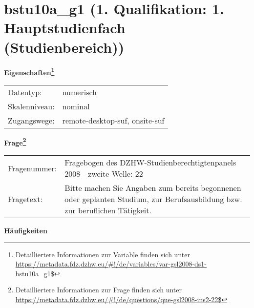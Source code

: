 
    \setcounter{footnote}{0}

    \vspace*{-1.8cm}
	\section{bstu10a\_g1 (1. Qualifikation: 1. Hauptstudienfach (Studienbereich))}
	\label{section:bstu10a_g1}



    \vspace*{0.5cm}
    \noindent\textbf{Eigenschaften\footnote{Detailliertere Informationen zur Variable finden sich unter
		\url{https://metadata.fdz.dzhw.eu/\#!/de/variables/var-gsl2008-ds1-bstu10a_g1$}}}\\
	\begin{tabularx}{\hsize}{@{}lX}
	Datentyp: & numerisch \\
	Skalenniveau: & nominal \\
	Zugangswege: &
	  remote-desktop-suf, 
	  onsite-suf
 \\
    \end{tabularx}



				\vspace*{0.5cm}
                \noindent\textbf{Frage\footnote{Detailliertere Informationen zur Frage finden sich unter
		              \url{https://metadata.fdz.dzhw.eu/\#!/de/questions/que-gsl2008-ins2-22$}}}\\
				\begin{tabularx}{\hsize}{@{}lX}
					Fragenummer: &
					  Fragebogen des DZHW-Studienberechtigtenpanels 2008 - zweite Welle:
					  22
 \\
					Fragetext: & Bitte machen Sie Angaben zum bereits begonnenen oder geplanten Studium, zur Berufsausbildung bzw. zur beruflichen Tätigkeit. \\
				\end{tabularx}





        		\vspace*{0.5cm}
                \noindent\textbf{Häufigkeiten}

